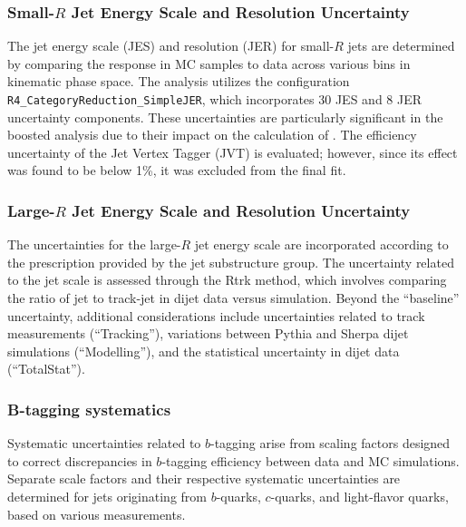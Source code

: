 \subsubsection*{Small-$R$ Jet Energy Scale and Resolution Uncertainty}
The jet energy scale (JES) and resolution (JER) for small-$R$ jets are determined by comparing the response in MC samples to data across various bins in kinematic phase space.
The analysis utilizes the configuration \texttt{R4\_CategoryReduction\_SimpleJER}, which incorporates 30 JES and 8 JER uncertainty components. These uncertainties are particularly significant in the boosted analysis due to their impact on the calculation of \met. 
The efficiency uncertainty of the Jet Vertex Tagger (JVT) is evaluated; however, since its effect was found to be below 1\%, it was excluded from the final fit.

\subsubsection*{Large-$R$ Jet Energy Scale and Resolution Uncertainty}
\label{sec:fatjetUncert}
The uncertainties for the large-$R$ jet energy scale are incorporated according to the prescription provided by the jet substructure group.
The uncertainty related to the jet \pt scale is assessed through the Rtrk method, which involves comparing the ratio of jet \pt to track-jet \pt in dijet data versus simulation. Beyond the ``baseline'' uncertainty, additional considerations include uncertainties related to track measurements (``Tracking''), variations between Pythia and Sherpa dijet simulations (``Modelling''), and the statistical uncertainty in dijet data (``TotalStat'').


\subsubsection*{B-tagging systematics}
Systematic uncertainties related to $b$-tagging arise from scaling factors designed to correct discrepancies in $b$-tagging efficiency between data and MC simulations. Separate scale factors and their respective systematic uncertainties are determined for jets originating from $b$-quarks, $c$-quarks, and light-flavor quarks, based on various measurements.
 
